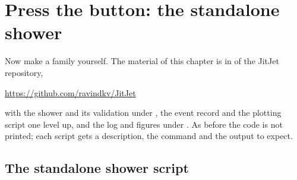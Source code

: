 \section{Press the button: the standalone shower}
\label{sec:mother_gives_birth:standalone_code}

Now make a family yourself. The material of this chapter is in
 of the JitJet repository,
\begin{center}
  \url{https://github.com/ravindkv/JitJet}
\end{center}
with the shower and its validation under , the
event record and the plotting script one level up, and the \CMSSW log and
figures under . As before the code is not printed;
each script gets a description, the command and the output to expect.

\subsection{The standalone shower script}

